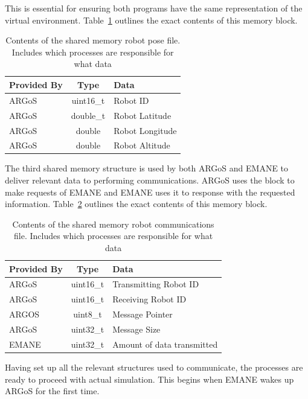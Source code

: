 This is essential for ensuring both programs have the same representation of the virtual environment.
Table~\ref{shm_pose} outlines the exact contents of this memory block.
\begin{table}[!ht]
\centering
\caption{Contents of the shared memory robot pose file. Includes which processes are responsible for what data}
\begin{adjustbox}{width=0.6\textwidth, center=\textwidth}
	\begin{tabular}{l|c|l}
		\multicolumn{1}{c|}{Provided By} & Type & Data \\ 
		\hline
		ARGoS & uint16\_t & Robot ID \\
		ARGoS & double\_t & Robot Latitude \\
		ARGoS & double & Robot Longitude \\
		ARGoS & double & Robot Altitude
	\end{tabular}
\end{adjustbox}
\label{shm_pose}
\end{table}
The third shared memory structure is used by both ARGoS and EMANE to deliver relevant data to performing communications.
ARGoS uses the block to make requests of EMANE and EMANE uses it to response with the requested information.
Table~\ref{shm_comms} outlines the exact contents of this memory block.\par
\begin{table}[!ht]
\centering
\caption{Contents of the shared memory robot communications file. Includes which processes are responsible for what data}
\begin{adjustbox}{width=0.7\textwidth, center=\textwidth}
	\begin{tabular}{l|c|l}
		\multicolumn{1}{c|}{Provided By} & Type & Data \\ 
		\hline
		ARGoS & uint16\_t & Transmitting Robot ID \\
		ARGoS & uint16\_t & Receiving Robot ID \\
		ARGOS & uint8\_t\* & Message Pointer \\
		ARGoS & uint32\_t & Message Size \\
		EMANE & uint32\_t & Amount of data transmitted
	\end{tabular}
\end{adjustbox}
\label{shm_comms}
\end{table}
Having set up all the relevant structures used to communicate, the processes are ready to proceed with actual simulation.
This begins when EMANE wakes up ARGoS for the first time.

